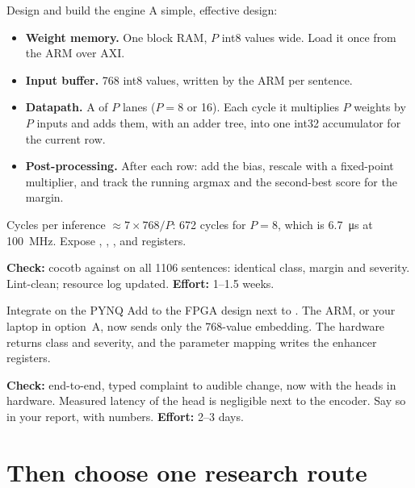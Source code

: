 \begin{stepbox}[label=st:ml:headrtl]{Design and build the engine}
A simple, effective design:
\begin{itemize}
  \item \textbf{Weight memory.} One block RAM, $P$ int8 values wide. Load it
        once from the ARM over AXI.
  \item \textbf{Input buffer.} 768 int8 values, written by the ARM per
        sentence.
  \item \textbf{Datapath.} A  of $P$ lanes ($P=8$ or 16). Each
        cycle it multiplies $P$ weights by $P$ inputs and adds them, with an
        adder tree, into one int32 accumulator for the current row.
  \item \textbf{Post-processing.} After each row: add the bias, rescale with a
        fixed-point multiplier, and track the running argmax and the
        second-best score for the margin.
\end{itemize}
Cycles per inference $\approx 7\times768/P$: 672 cycles for $P=8$, which is
\qty{6.7}{\micro\s} at \qty{100}{\MHz}. Expose , ,
,  and  registers.

\textbf{Check:} cocotb against  on all 1106
sentences: identical class, margin and severity. Lint-clean; resource log
updated. \textbf{Effort:} 1--1.5 weeks.
\end{stepbox}

\begin{stepbox}[label=st:ml:headint]{Integrate on the PYNQ}
Add  to the FPGA design next to . The ARM, or
your laptop in option~A, now sends only the 768-value embedding. The hardware
returns class and severity, and the parameter mapping writes the enhancer
registers.

\textbf{Check:} end-to-end, typed complaint to audible change, now with the
heads in hardware. Measured latency of the head is negligible next to the
encoder. Say so in your report, with numbers. \textbf{Effort:} 2--3 days.
\end{stepbox}

\section{Then choose one research route}\label{sec:ml:routes}

